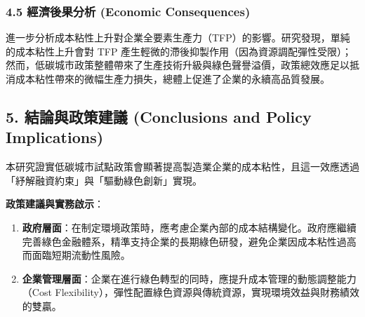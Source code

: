 \documentclass[11pt,a4paper]{article}
\begin{document}
\subsubsection{4.5 經濟後果分析 (Economic Consequences)}
進一步分析成本粘性上升對企業全要素生產力（TFP）的影響。研究發現，單純的成本粘性上升會對 TFP 產生輕微的滯後抑製作用（因為資源調配彈性受限）；然而，低碳城市政策整體帶來了生產技術升級與綠色聲譽溢價，政策總效應足以抵消成本粘性帶來的微幅生產力損失，總體上促進了企業的永續高品質發展。

\subsection{5. 結論與政策建議 (Conclusions and Policy Implications)}
本研究證實低碳城市試點政策會顯著提高製造業企業的成本粘性，且這一效應透過「紓解融資約束」與「驅動綠色創新」實現。

\textbf{政策建議與實務啟示}：
\begin{enumerate}[leftmargin=2em]
    \item \textbf{政府層面}：在制定環境政策時，應考慮企業內部的成本結構變化。政府應繼續完善綠色金融體系，精準支持企業的長期綠色研發，避免企業因成本粘性過高而面臨短期流動性風險。
    \item \textbf{企業管理層面}：企業在進行綠色轉型的同時，應提升成本管理的動態調整能力（Cost Flexibility），彈性配置綠色資源與傳統資源，實現環境效益與財務績效的雙贏。
\end{enumerate}
\end{document}
